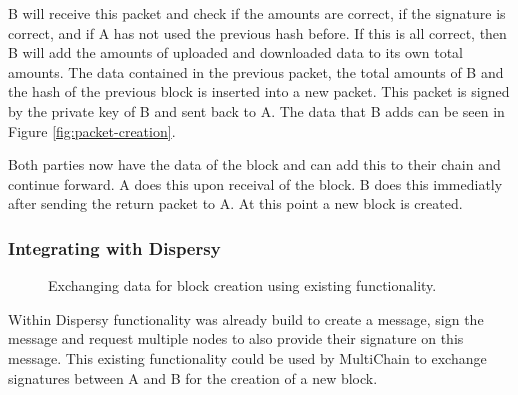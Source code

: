 B will receive this packet and check if the amounts are correct, if the signature is correct,
and if A has not used the previous hash before.
If this is all correct,
then B will add the amounts of uploaded and downloaded data to its own total amounts.
The data contained in the previous packet, the total amounts of B and the hash of the previous block is
inserted into a new packet.
This packet is signed by the private key of B and sent back to A.
The data that B adds can be seen in Figure \ref{fig:packet-creation}.

Both parties now have the data of the block and can add this to their chain and continue forward.
A does this upon receival of the block.
B does this immediatly after sending the return packet to A.
At this point a new block is created.

\subsubsection{Integrating with Dispersy}
\begin{figure}[!h]
\centering
{}

\caption{Exchanging data for block creation using existing functionality.}
\label{fig:block-creation-old}
\end{figure}
Within Dispersy functionality was already build to create a message, sign the message
and request multiple nodes to also provide their signature on this message.
This existing functionality could be used by MultiChain to exchange signatures
between A and B for the creation of a new block.

